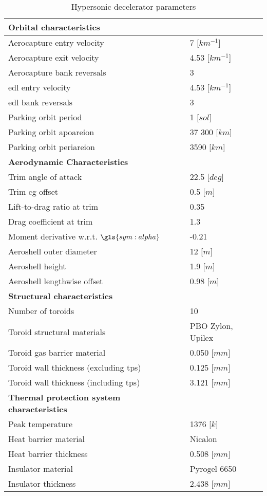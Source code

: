 \begin{table}[H]
	\centering
	\caption{Hypersonic decelerator parameters}
	\label{tab:DeceleratorPar}
	\begin{tabular}{|p{}|p{}|} \hline
		\textbf{Orbital characteristics}             	& 			\\ \hline \hline
		Aerocapture entry velocity       				&	 7 [$km^{-1}$] 		\\ \hline
		Aerocapture exit velocity				 		&    4.53 [$km^{-1}$]  	  	\\ \hline
		Aerocapture bank reversals				        &  	 3 		\\ \hline
		\gls{edl} entry velocity					 	&  	 4.53 [$km^{-1}$]	\\ \hline
		\gls{edl} bank reversals					 	&  	 3	\\ \hline
		Parking orbit period						 	&  	 1 [$sol$]		\\ \hline
		Parking orbit apoareion			 				&  	37 300 [$km$]		\\ \hline
		Parking orbit periareion			 			&  	3590 [$km$]		\\ \hline
		\textbf{Aerodynamic Characteristics}			&			\\ \hline \hline
		Trim angle of attack				 			&  22.5 [$deg$]			\\ \hline
		Trim \gls{cg} offset							&  0.5 [$m$]		\\ \hline
		Lift-to-drag ratio at trim			 			&  	0.35	\\ \hline
		Drag coefficient at trim			 			&  	1.3	\\ \hline
		Moment derivative w.r.t. $\gls{sym:alpha}$		&  	-0.21		\\ \hline
		Aeroshell outer diameter						&  	12 [$m$]		\\ \hline
		Aeroshell height								&  	1.9 [$m$]		\\ \hline
		Aeroshell lengthwise offset						&  	0.98 [$m$]		\\ \hline
		\textbf{Structural characteristics}				&			\\ \hline \hline
		Number of toroids					 			&   10			\\ \hline 
		Toroid structural materials						 			&  	PBO Zylon, Upilex		\\ \hline
		Toroid gas barrier material		&	0.050 [$mm$]		\\ \hline
		Toroid wall thickness (excluding \gls{tps})		&	0.125 [$mm$]		\\ \hline
		Toroid wall thickness (including \gls{tps})		&	3.121 [$mm$]		\\ \hline
		\textbf{Thermal protection system characteristics}	&		\\ \hline \hline
		Peak temperature							&	 1376 [$k$]		\\ \hline
		Heat barrier material							&	Nicalon		\\ \hline
		Heat barrier thickness							&	0.508 [$mm$]		\\ \hline
		Insulator material								&	Pyrogel 6650		\\ \hline
		Insulator thickness								&	2.438 [$mm$]		\\ \hline
			

\end{tabular}
\end{table}
